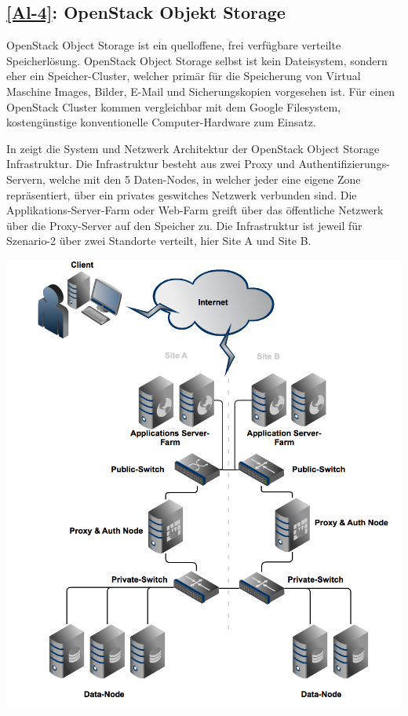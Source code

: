 \subsection{\ref{Al-4}: OpenStack Objekt Storage}
OpenStack Object Storage ist ein quelloffene, frei verfügbare verteilte Speicherlösung. OpenStack Object Storage selbst ist kein Dateisystem, sondern eher ein Speicher-Cluster, welcher primär für die Speicherung von Virtual Maschine Images, Bilder, E-Mail und Sicherungskopien vorgesehen ist. Für einen OpenStack Cluster kommen vergleichbar mit dem Google Filesystem, kostengünstige konventionelle Computer-Hardware zum Einsatz. 

In  zeigt die System und Netzwerk Architektur der OpenStack Object Storage Infrastruktur. Die Infrastruktur besteht aus zwei Proxy und Authentifizierungs-Servern, welche mit den 5 Daten-Nodes, in welcher jeder eine eigene Zone repräsentiert, über ein privates geswitches Netzwerk verbunden sind. Die Applikations-Server-Farm oder Web-Farm greift über das öffentliche Netzwerk über die Proxy-Server auf den Speicher zu. Die Infrastruktur ist jeweil für Szenario-2 über zwei Standorte verteilt, hier Site A und Site B.

\begin{center}
\includegraphics[width=\linewidth, keepaspectratio = true]{media/OpenStack.png}
\end{center}


